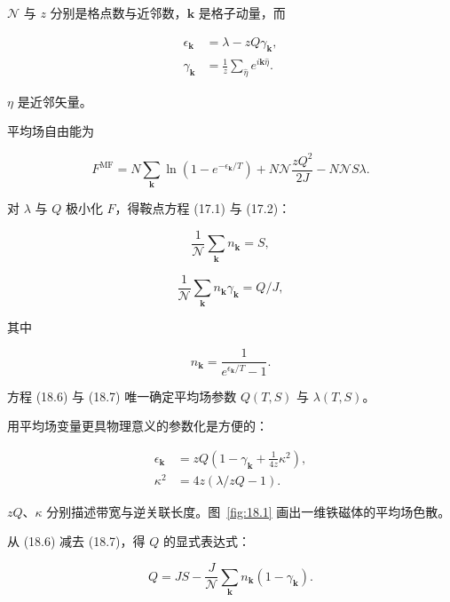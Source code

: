 $\mathcal{N}$ 与 $z$ 分别是格点数与近邻数，$\mathbf{k}$ 是格子动量，而

\begin{align*}
\epsilon_ {\mathbf {k}} & = \lambda - z Q \gamma_ {\mathbf {k}} ,\\
\gamma_ {\mathbf {k}} & = \frac {1}{z} \sum_ {\hat {\eta}} e ^ {i \mathbf {k} \hat {\eta}} .
\tag{18.4}
\end{align*}

$\eta$ 是近邻矢量。

平均场自由能为

\begin{equation*}
F ^ {\mathrm{MF}} = N \sum_ {\mathbf {k}} \ln \left( 1 - e ^ {- \epsilon_{\mathbf {k}} / T} \right) + N \mathcal {N} \frac {z Q ^ {2}}{2 J} - N \mathcal {N} S \lambda .
\tag{18.5}
\end{equation*}

对 $\lambda$ 与 $Q$ 极小化 $F$，得鞍点方程 (17.1) 与 (17.2)：

\begin{equation*}
\frac {1}{\mathcal {N}} \sum_ {\mathbf {k}} n _ {\mathbf {k}} = S ,
\tag{18.6}
\end{equation*}

\begin{equation*}
\frac {1}{\mathcal {N}} \sum_ {\mathbf {k}} n _ {\mathbf {k}} \gamma_ {\mathbf {k}} = Q / J ,
\tag{18.7}
\end{equation*}

其中

\begin{equation*}
n _ {\mathbf {k}} = \frac {1}{e ^ {\epsilon_{\mathbf {k}} / T} - 1}.
\tag{18.8}
\end{equation*}

方程 (18.6) 与 (18.7) 唯一确定平均场参数 $Q(T, S)$ 与 $\lambda(T, S)$。

用平均场变量更具物理意义的参数化是方便的：

\begin{align*}
\epsilon_ {\mathbf {k}} & = z Q \left( 1 - \gamma_ {\mathbf {k}} + \frac {1}{4z} \kappa^ {2} \right) ,\\
\kappa^ {2} & = 4 z \left( \lambda / z Q - 1 \right) .
\tag{18.9}
\end{align*}

$zQ$、$\kappa$ 分别描述带宽与逆关联长度。图~\ref{fig:18.1} 画出一维铁磁体的平均场色散。

从 (18.6) 减去 (18.7)，得 $Q$ 的显式表达式：

\begin{equation*}
Q = J S - \frac {J}{\mathcal {N}} \sum_ {\mathbf {k}} n _ {\mathbf {k}} \left( 1 - \gamma_ {\mathbf {k}} \right).
\tag{18.10}
\end{equation*}


